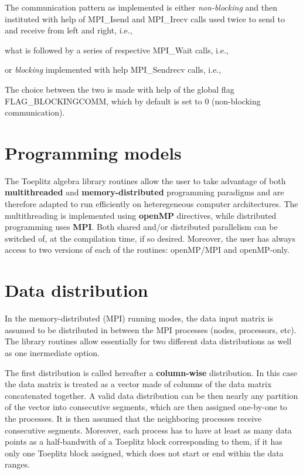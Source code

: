 The communication pattern as implemented is either {\itshape non-\/blocking} and then instituted with help of {\ttfamily M\-P\-I\-\_\-\-Isend} and {\ttfamily M\-P\-I\-\_\-\-Irecv} calls used twice to send to and receive from left and right, i.\-e.,


\begin{DoxyCodeInclude}
\end{DoxyCodeInclude}
 what is followed by a series of respective {\ttfamily M\-P\-I\-\_\-\-Wait} calls, i.\-e.,


\begin{DoxyCodeInclude}
\end{DoxyCodeInclude}
 or {\itshape blocking} implemented with help {\ttfamily M\-P\-I\-\_\-\-Sendrecv} calls, i.\-e.,


\begin{DoxyCodeInclude}
\end{DoxyCodeInclude}
 The choice between the two is made with help of the global flag {\ttfamily F\-L\-A\-G\-\_\-\-B\-L\-O\-C\-K\-I\-N\-G\-C\-O\-M\-M}, which by default is set to 0 (non-\/blocking communication). \hypertarget{toeplitz_progmodels}{}\section{Programming models}\label{toeplitz_progmodels}
The Toeplitz algebra library routines allow the user to take advantage of both {\bfseries multithreaded} and {\bfseries memory-\/distributed} programming paradigms and are therefore adapted to run efficiently on heteregeneous computer architectures. The multithreading is implemented using {\bfseries open\-M\-P} directives, while distributed programming uses {\bfseries M\-P\-I}. Both shared and/or distributed parallelism can be switched of, at the compilation time, if so desired. Moreover, the user has always access to two versions of each of the routines\-: open\-M\-P/\-M\-P\-I and open\-M\-P-\/only. \hypertarget{toeplitz_datadistr}{}\section{Data distribution}\label{toeplitz_datadistr}
In the memory-\/distributed (M\-P\-I) running modes, the data input matrix is assumed to be distributed in between the M\-P\-I processes (nodes, processors, etc). The library routines allow essentially for two different data distributions as well as one inermediate option.



The first distribution is called hereafter a {\bfseries column-\/wise} distribution. In this case the data matrix is treated as a vector made of columns of the data matrix concatenated together. A valid data distribution can be then nearly any partition of the vector into consecutive segments, which are then assigned one-\/by-\/one to the processes. It is then assumed that the neighboring processes receive consecutive segments. Moreover, each process has to have at least as many data points as a half-\/bandwith of a Toeplitz block corresponding to them, if it has only one Toeplitz block assigned, which does not start or end within the data ranges.

